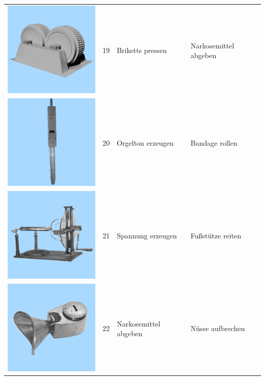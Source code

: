 \documentclass[
  english,
  man,floatsintext]{apa7}
\begin{document}
\begin{center}
\begin{ThreePartTable}
\begin{longtable}{llll}
\includegraphics[valign=c, scale=0.19]{../materials/unfamiliar/19.png} & 19 & Briketts pressen & Narkosemittel abgeben\\
\includegraphics[valign=c, scale=0.19]{../materials/unfamiliar/20.png} & 20 & Orgelton erzeugen & Bandage rollen\\
\includegraphics[valign=c, scale=0.19]{../materials/unfamiliar/21.png} & 21 & Spannung erzeugen & Fußstütze reiten\\
\includegraphics[valign=c, scale=0.19]{../materials/unfamiliar/22.png} & 22 & Narkosemittel abgeben & Nüsse aufbrechen\\

\end{longtable}
\end{ThreePartTable}
\end{center}
\end{document}
